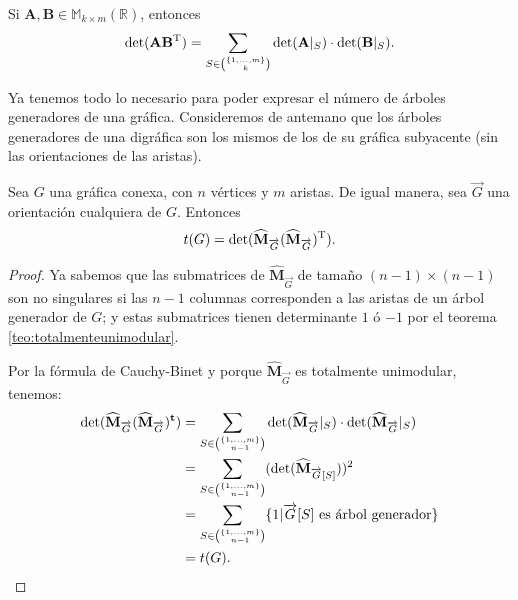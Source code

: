 \begin{teo}

Si $\mathbf{A}, \mathbf{B} \in \mathbb{M}_{k \times m}(\mathbb{R})$, entonces 
$$
\det(\mathbf{A}\mathbf{B}^{\textnormal{T}}) = 
\sum_{S \in \binom{\{1,\ldots, m\}}{k}} \det(\mathbf{A}|_{S}) \cdot \det(\mathbf{B}|_{S}).
$$
\end{teo}

Ya tenemos  todo lo necesario para poder expresar el número de árboles generadores de una gráfica. Consideremos de antemano que los árboles generadores de una digráfica son los mismos de los de su gráfica subyacente (sin las orientaciones de las aristas). 

\begin{teo}
Sea $G$ una gráfica conexa, con $n$ vértices y $m$ aristas. De igual manera, sea $\overrightarrow{G}$ una orientación cualquiera de $G$. Entonces
$$
t(G) = \det(\widehat{\mathbf{M}}_{\overrightarrow{G}}(\widehat{\mathbf{M}}_{\overrightarrow{G}})^{\textnormal{T}}).
$$
\end{teo}

\begin{proof}
Ya sabemos que las submatrices de $\widehat{\mathbf{M}}_{\overrightarrow{G}}$  de tamaño $(n-1) \times (n-1)$ son no singulares si las $n-1$ columnas corresponden a las aristas de un árbol generador de $G$; y estas submatrices tienen determinante $1$ ó $-1$ por el teorema \ref{teo:totalmenteunimodular}.

Por la fórmula de Cauchy-Binet y porque $\widehat{\mathbf{M}}_{\overrightarrow{G}}$ es totalmente unimodular, tenemos:
\begin{align*}
    \det(\widehat{\mathbf{M}}_{\overrightarrow{G}}(\widehat{\mathbf{M}}_{\overrightarrow{G}})^{\mathbf{t}}) &= \sum_{S \in \binom{\{1,\ldots, m\}}{n-1}} \det(\widehat{\mathbf{M}}_{\overrightarrow{G}}|_{S}) \cdot \det(\widehat{\mathbf{M}}_{\overrightarrow{G}}|_{S})\\ &= \sum_{S \in \binom{\{1,\ldots, m\}}{n-1}} (\det(\widehat{\mathbf{M}}_{\overrightarrow{G}[S]}))^{2} \\ &= \sum_{S \in \binom{\{1,\ldots, m\}}{n-1} \vspace{1em}}\{ 1 | \overrightarrow{G}[S] \textnormal{ es árbol generador} \} \\ &= t(G).
\end{align*}

\end{proof}

